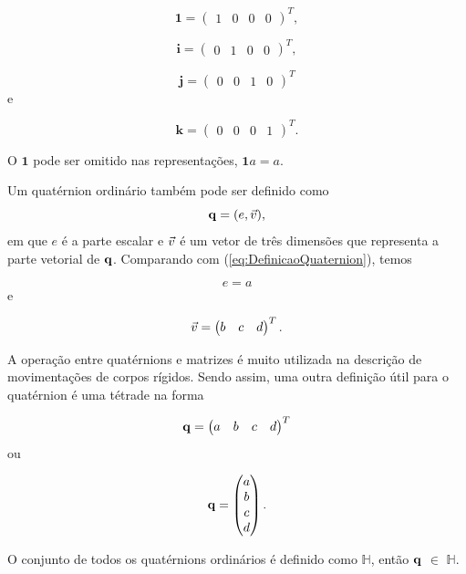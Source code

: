 \[
\mathbf{1}=\begin{pmatrix}1 & 0 & 0 & 0\end{pmatrix}^{T},
\]


\[
\mathbf{i}=\begin{pmatrix}0 & 1 & 0 & 0\end{pmatrix}^{T},
\]


\[
\mathbf{j}=\begin{pmatrix}0 & 0 & 1 & 0\end{pmatrix}^{T}
\]
e

\[
\mathbf{k}=\begin{pmatrix}0 & 0 & 0 & 1\end{pmatrix}^{T}.
\]


O $\mathbf{1}$ pode ser omitido nas representações, $\mathbf{1}a=a$.

Um quatérnion ordinário também pode ser definido como 
\begin{equation}
\mathbf{q}=(e,\vec{v}),\label{eq:DefinicaoParQ}
\end{equation}
em que $e$ é a parte escalar e \textbf{$\vec{v}$} é um vetor de
três dimensões que representa a parte vetorial de $\mathbf{q}$. Comparando
com (\ref{eq:DefinicaoQuaternion}), temos

\[
e=a
\]
e

\[
\vec{v}=\begin{pmatrix}b & c & d\end{pmatrix}^{T}.
\]


A operação entre quatérnions e matrizes é muito utilizada na descrição
de movimentações de corpos rígidos. Sendo assim, uma outra definição
útil para o quatérnion é uma tétrade na forma

\begin{equation}
\mathbf{\mathbf{q}}=\begin{pmatrix}a & b & c & d\end{pmatrix}^{T}\label{eq:DefinicaoTetradeQ}
\end{equation}
ou

\begin{equation}
\mathbf{\mathbf{q}}=\begin{pmatrix}a\\
b\\
c\\
d
\end{pmatrix}.
\end{equation}


O conjunto de todos os quatérnions ordinários é definido como $\mathbb{H}$,
então \textbf{$\mathbf{q}$} $\in$ $\mathbb{H}$.

